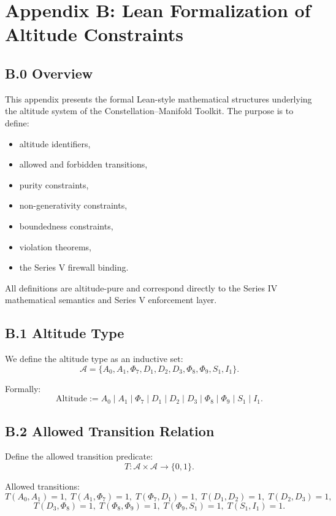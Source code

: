 \appendix
\section*{Appendix B: Lean Formalization of Altitude Constraints}

\subsection*{B.0 Overview}

This appendix presents the formal Lean-style mathematical structures
underlying the altitude system of the Constellation–Manifold Toolkit.
The purpose is to define:
\begin{itemize}
    \item altitude identifiers,
    \item allowed and forbidden transitions,
    \item purity constraints,
    \item non-generativity constraints,
    \item boundedness constraints,
    \item violation theorems,
    \item the Series V firewall binding.
\end{itemize}

All definitions are altitude-pure and correspond directly to the
Series IV mathematical semantics and Series V enforcement layer.

\subsection*{B.1 Altitude Type}

We define the altitude type as an inductive set:
\[
\mathcal{A} =
\{A_0, A_1, \Phi_7, D_1, D_2, D_3, \Phi_8, \Phi_9, S_1, I_1\}.
\]

Formally:
\[
\text{Altitude} :=
A_0 \mid A_1 \mid \Phi_7 \mid D_1 \mid D_2 \mid D_3 \mid
\Phi_8 \mid \Phi_9 \mid S_1 \mid I_1.
\]

\subsection*{B.2 Allowed Transition Relation}

Define the allowed transition predicate:
\[
T : \mathcal{A} \times \mathcal{A} \to \{0,1\}.
\]

Allowed transitions:
\[
T(A_0,A_1)=1,\;
T(A_1,\Phi_7)=1,\;
T(\Phi_7,D_1)=1,\;
T(D_1,D_2)=1,\;
T(D_2,D_3)=1,
\]
\[
T(D_3,\Phi_8)=1,\;
T(\Phi_8,\Phi_9)=1,\;
T(\Phi_9,S_1)=1,\;
T(S_1,I_1)=1.
\]

